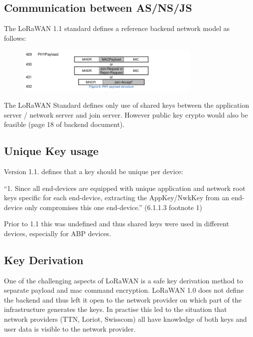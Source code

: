 {\hypertarget{h.rext4wcd7qnn}{\subsection{\texorpdfstring{{Communication
between
AS/NS/JS}}{Communication between AS/NS/JS}}\label{h.rext4wcd7qnn}}

{The LoRaWAN 1.1 standard defines a reference backend network model as
follows:}
\begin{figure}[h!]
{\includegraphics[width=0.8\textwidth]{images/image10.png}}
\end{figure}

{The LoRaWAN Standard defines only use of shared keys between the
application server / network server and join server. However public key
crypto would also be feasible (page 18 of backend document).}

\hypertarget{h.rxbla8bfpdr7}{\subsection{\texorpdfstring{{Unique Key
usage}}{Unique Key usage}}\label{h.rxbla8bfpdr7}}

{Version 1.1. defines that a key should be unique per device: }

{``1. Since all end-devices are equipped with unique application and
network root keys specific for each end-device, extracting the
AppKey/NwkKey from an end-device only compromises this one end-device.''
(6.1.1.3 footnote 1)}

{Prior to 1.1 this was undefined and thus shared keys were used in
different devices, especially for ABP devices.}

\hypertarget{h.ukt1jzew31xa}{\subsection{\texorpdfstring{{Key
Derivation}}{Key Derivation}}\label{h.ukt1jzew31xa}}

{One of the challenging aspects of LoRaWAN is a safe key derivation
method to separate payload and mac command encryption. LoRaWAN 1.0 does
not define the backend and thus left it open to the network provider on
which part of the infrastructure generates the keys. In practise this
led to the situation that network providers (TTN, Loriot, Swisscom) all
have knowledge of both keys and user data is visible to the network
provider.}

}
